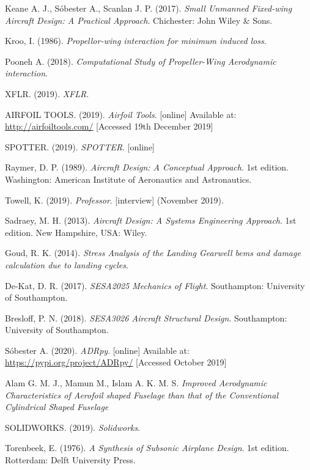\documentclass[../main.tex]{subfiles}
\begin{document}
\begin{thebibliography}{999}


  Keane A. J., S\'obester A., Scanlan J. P.
  (2017).
  \emph{Small Unmanned Fixed-wing Aircraft Design: A Practical Approach}.
  Chichester: John Wiley \& Sons.

  Kroo, I.
  (1986).
  \emph{Propellor-wing interaction for minimum induced loss}.

  Pooneh A.
  (2018).
  \emph{Computational Study of Propeller-Wing Aerodynamic interaction}.

  XFLR.
  (2019).
  \emph{XFLR}.

  AIRFOIL TOOLS.
  (2019).
  \emph{Airfoil Tools}.
  [online]
  Available at:
  \url{http://airfoiltools.com/}
  [Accessed 19th December 2019]

  SPOTTER.
  (2019).
  \emph{SPOTTER}.
  [online]

  Raymer, D. P.
  (1989).
  \emph{Aircraft Design: A Conceptual Approach}.
  1st edition.
  Washington: American Institute of Aeronautics and Astronautics.

  Towell, K.
  (2019).
  \emph{Professor}.
  [interview]
  (November 2019).

  Sadraey, M. H.
  (2013).
  \emph{Aircraft Design: A Systems Engineering Approach}.
  1st edition.
  New Hampshire, USA: Wiley.

  Goud, R. K.
  (2014).
  \emph{Stress Analysis of the Landing Gearwell bems and damage calculation due to landing cycles}.

  De-Kat, D. R.
  (2017).
  \emph{SESA2025 Mechanics of Flight}.
  Southampton: University of Southampton.

  Bresloff, P. N.
  (2018).
  \emph{SESA3026 Aircraft Structural Design}.
  Southampton: University of Southampton.

  S\'obester A.
  (2020).
  \emph{ADRpy}.
  [online]
  Available at:
  \url{https://pypi.org/project/ADRpy/}
  [Accessed October 2019]

  Alam G. M. J., Mamun M., Islam A. K. M. S.
  \emph{Improved Aerodynamic Characteristics of Aerofoil shaped Fuselage than that of the Conventional Cylindrical Shaped Fuselage}


  SOLIDWORKS.
  (2019).
  \emph{Solidworks}.

  Torenbeek, E.
  (1976).
  \emph{A Synthesis of Subsonic Airplane Design}.
  1st edition.
  Rotterdam: Delft University Press.

\end{thebibliography}
\end{document}
